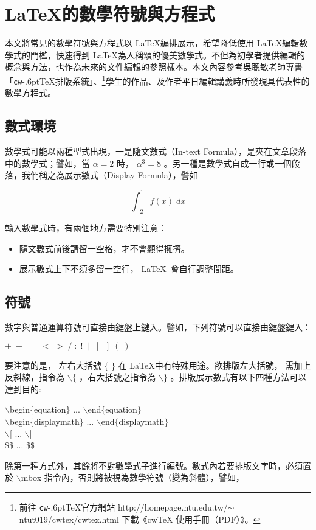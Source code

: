%
\chapter{ \LaTeX{\MB 的數學符號與方程式}}
本文將常見的數學符號與方程式以 \LaTeX 編排展示，希望降低使用  \LaTeX 編輯數學式的門檻，快速得到  \LaTeX 為人稱頌的優美數學式。不但為初學者提供編輯的概念與方法，也作為未來的文件編輯的參照樣本。本文內容參考吳聰敏老師專書「\texttt{cw}\kern-.6pt\TeX 排版系統」、\footnote{前往 \texttt{cw}\kern-.6pt\TeX 官方網站 http://homepage.ntu.edu.tw/$\sim$ntut019/cwtex/cwtex.html 下載《cwTeX 使用手冊（PDF）》。}學生的作品、及作者平日編輯講義時所發現具代表性的數學方程式。

\section{數式環境}
數學式可能以兩種型式出現，一是隨文數式（In-text Formula），是夾在文章段落中的數學式；譬如，當 $\alpha=2$ 時， $\alpha^3=8$ 。另一種是數學式自成一行或一個段落，我們稱之為展示數式（Display Formula），譬如

$$\int_{-2}^{1} f(x)\;dx$$

輸入數學式時，有兩個地方需要特別注意：
\begin{itemize}
\item 隨文數式前後請留一空格，才不會顯得擁擠。
\item 展示數式上下不須多留一空行， \LaTeX\ 會自行調整間距。
\end{itemize}

\section{符號}
數字與普通運算符號可直接由鍵盤上鍵入。譬如，下列符號可以直接由鍵盤鍵入：

        \begin{center}
         $  + \;-\; =\; <\; > \;/ \;:\; !\;\; |\; \;[\;\; ] \;(\; )$\\
        \end{center}
要注意的是， 左右大括號 $\{$ $\}$ 在 \LaTeX 中有特殊用途。欲排版左大括號， 需加上反斜線，指令為 $\backslash\{$ ，右大括號之指令為 $\backslash\}$ 。排版展示數式有以下四種方法可以達到目的:
        \begin{center}
$\backslash$begin$\{$equation$\}$ ... $\backslash$end$\{$equation$\}$\\
$\backslash$begin$\{$displaymath$\}$ ... $\backslash$end$\{$displaymath$\}$\\
$\backslash$[ ... $\backslash$]\\
\$\$ ... \$\$
        \end{center}
除第一種方式外，其餘將不對數學式子進行編號。數式內若要排版文字時，必須置於 $\backslash$mbox 指令內，否則將被視為數學符號（變為斜體），譬如，

